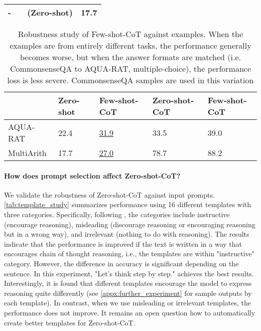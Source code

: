 \documentclass{article}
\newcommand{\CoT}{chain of thought\xspace}
\newcommand{\ours}{Zero-shot-CoT\xspace}
\newcommand{\theirs}{Few-shot-CoT\xspace}
\newcommand{\theirsz}{Zero-shot\xspace}
\begin{document}
\begin{table}[t]
\begin{tabular}{lllr}
\midrule
-&&(\theirsz) & 17.7\\
\bottomrule
\end{tabular}
\vspace{-0.2cm}
\label{tab:template_study}
\end{table} \begin{table}[t]\centering
\footnotesize
\caption{Robustness study of \theirs against examples. When the examples are from entirely different tasks, the performance generally becomes worse, but when the answer formats are matched (i.e. CommonsenseQA to AQUA-RAT, multiple-choice), the performance loss is less severe. CommonsenseQA samples are used in this variation}
\begin{tabular}{p{}p{}p{}p{}p{}}
\toprule
&\theirsz &\theirs &\ours &\theirs \\\midrule
AQUA-RAT &22.4 &\underline{31.9} &33.5 &39.0 \\
MultiArith &17.7 &\underline{27.0} &78.7 &88.2 \\
\bottomrule
\end{tabular}
\captionsetup{skip=5pt}

\label{tab:robustness_against_examples}
\end{table} 
\paragraph{How does prompt selection affect \ours?}
We validate the robustness of \ours against input prompts. \autoref{tab:template_study} summarizes performance using 16 different templates with three categories. Specifically, following \citet{websonpavlick2022prompt}, the categories include instructive (encourage reasoning), misleading (discourage reasoning or encouraging reasoning but in a wrong way), and irrelevant (nothing to do with reasoning). The results indicate that the performance is improved if the text is written in a way that encourages \CoT reasoning, i.e., the templates are within "instructive" category. However, the difference in accuracy is significant depending on the sentence. In this experiment, "Let’s think step by step." achieves the best results. Interestingly, it is found that different templates encourage the model to express reasoning quite differently (see \autoref{appx:further_experiment} for sample outputs by each template). In contrast, when we use misleading or irrelevant templates, the performance does not improve. It remains an open question how to automatically create better templates for \ours.
\end{document}
